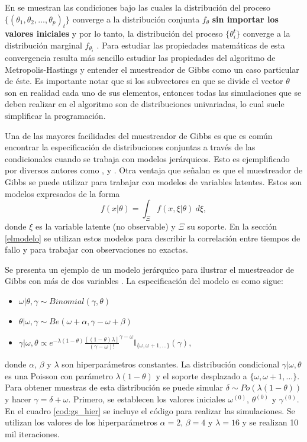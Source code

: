\documentclass[11pt,a4paper]{article}
\begin{document}
En \citet{geman} se muestran las condiciones bajo las cuales la distribución del proceso $\lbrace (\theta_1, \theta_2, \dots, \theta_p)_t\rbrace$ converge a la distribución conjunta $f_{\theta}$ \textbf{sin importar los valores iniciales} y por lo tanto, la distribución del proceso $\lbrace \theta_i^t \rbrace$ converge a la distribución marginal $f_{\theta_i}$ \citep{gelfand_smith}. Para estudiar las propiedades matemáticas de esta convergencia resulta más sencillo estudiar las propiedades del algoritmo de Metropolis-Hastings y entender el muestreador de Gibbs como un caso particular de éste. Es importante notar que si los subvectores en que se divide el vector $\theta$ son en realidad cada uno de sus elementos, entonces todas las simulaciones que se deben realizar en el algoritmo son de distribuciones univariadas, lo cual suele simplificar la programación.

Una de las mayores facilidades del muestreador de Gibbs es que es común encontrar la especificación de distribuciones conjuntas a través de las condicionales cuando se trabaja con modelos jerárquicos. Esto es ejemplificado por diversos autores como \citet{casella}, \citet{gelman} y \citet{gelfand_smith}. Otra ventaja que señalan \citet{casella} es que el muestreador de Gibbs se puede utilizar para trabajar con modelos de variables latentes. Estos son modelos expresados de la forma $$f(x| \theta) = \int_\Xi f(x, \xi | \theta) \ d\xi,$$ donde $\xi$ es la variable latente (no observable) y $\Xi$ su soporte. En la sección \ref{elmodelo} se utilizan estos modelos para describir la correlación entre tiempos de fallo y para trabajar con observaciones no exactas.

Se presenta un ejemplo de un modelo jerárquico para ilustrar el muestreador de Gibbs con más de dos variables \citep{casella_gs}. La especificación del modelo es como sigue:
\begin{itemize}
\item $\omega|\theta, \gamma \sim Binomial(\gamma, \theta)$
\item $\theta | \omega, \gamma \sim Be(\omega + \alpha, \gamma - \omega + \beta)$
\item $\gamma | \omega, \theta \propto e^{-\lambda(1-\theta)}\frac{[(1-\theta)\lambda]}{(\gamma - \omega)!}^{\gamma - \omega} \mathbb{I}_{\lbrace \omega, \omega + 1, \dots \rbrace}(\gamma),$
\end{itemize}
donde $\alpha$, $\beta$ y $\lambda$ son hiperparámetros constantes. La distribución condicional $\gamma | \omega, \theta$ es una Poisson con parámetro $\lambda(1-\theta)$ y el soporte desplazado a $\lbrace \omega, \omega + 1, \dots \rbrace$. Para obtener muestras de esta distribución se puede simular $\delta \sim Po(\lambda(1-\theta))$ y hacer $\gamma = \delta + \omega$. Primero, se establecen los valores iniciales $\omega^{(0)}$, $\theta^{(0)}$ y $\gamma^{(0)}$. En el cuadro \ref{cod:gs_hier} se incluye el código para realizar las simulaciones. Se utilizan los valores de los hiperparámetros $\alpha = 2$, $\beta = 4$ y $\lambda = 16$ y se realizan 10 mil iteraciones.
\end{document}

